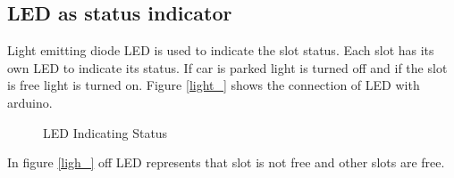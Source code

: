 \subsection{LED as status indicator}
Light emitting diode LED is used to indicate the slot status. Each slot has its own LED to indicate its status. If car is parked light is turned off and if the slot is free light is turned on. Figure \ref{light_} shows the connection of LED with arduino. 


\begin{figure}[H]
\centering
{} 
\hspace{1cm}
\caption{LED Indicating Status}
\end{figure}
In figure \ref{ligh_} off LED represents that  slot is not free and other slots are free.

